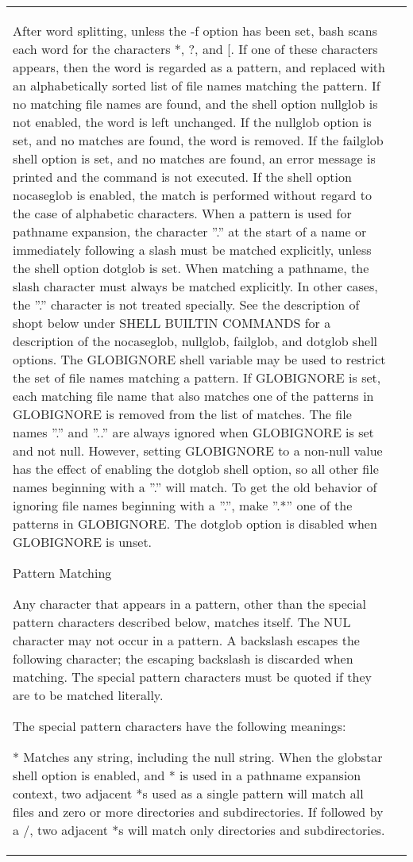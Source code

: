 \documentclass[11pt]{article}
\begin{document}
\begin{longtable}{p{}p{}}
{{{After word splitting, unless the -f option has been set, bash scans each word for the characters *, ?, and [. If one of these characters appears, then the word is regarded as a pattern, and replaced with an alphabetically sorted list of file names matching the pattern. If no matching file names are found, and the shell option nullglob is not enabled, the word is left unchanged. If the nullglob option is set, and no matches are found, the word is removed. If the failglob shell option is set, and no matches are found, an error message is printed and the command is not executed. If the shell option nocaseglob is enabled, the match is performed without regard to the case of alphabetic characters. When a pattern is used for pathname expansion, the character ''.'' at the start of a name or immediately following a slash must be matched explicitly, unless the shell option dotglob is set. When matching a pathname, the slash character must always be matched explicitly. In other cases, the ''.'' character is not treated specially. See the description of shopt below under SHELL BUILTIN COMMANDS for a description of the nocaseglob, nullglob, failglob, and dotglob shell options.
The GLOBIGNORE shell variable may be used to restrict the set of file names matching a pattern. If GLOBIGNORE is set, each matching file name that also matches one of the patterns in GLOBIGNORE is removed from the list of matches. The file names ''.'' and ''..'' are always ignored when GLOBIGNORE is set and not null. However, setting GLOBIGNORE to a non-null value has the effect of enabling the dotglob shell option, so all other file names beginning with a ''.'' will match. To get the old behavior of ignoring file names beginning with a ''.'', make ''.*'' one of the patterns in GLOBIGNORE. The dotglob option is disabled when GLOBIGNORE is unset.

Pattern Matching

Any character that appears in a pattern, other than the special pattern characters described below, matches itself. The NUL character may not occur in a pattern. A backslash escapes the following character; the escaping backslash is discarded when matching. The special pattern characters must be quoted if they are to be matched literally.

The special pattern characters have the following meanings:

*
Matches any string, including the null string. When the globstar shell option is enabled, and * is used in a pathname expansion context, two adjacent *s used as a single pattern will match all files and zero or more directories and subdirectories. If followed by a /, two adjacent *s will match only directories and subdirectories.

}}}
\end{longtable}
\end{document}

